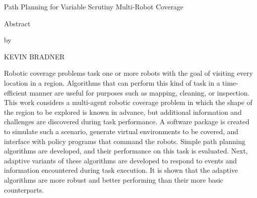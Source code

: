 \pagebreak

\begin{center}

Path Planning for Variable Scrutiny Multi-Robot Coverage

Abstract

by

KEVIN BRADNER

\end{center}

Robotic coverage problems task one or more robots with the goal of visiting every location in a region. Algorithms that can perform this kind of task in a time-efficient manner are useful for purposes such as mapping, cleaning, or inspection. This work considers a multi-agent robotic coverage problem in which the shape of the region to be explored is known in advance, but additional information and challenges are discovered during task performance. A software package is created to simulate such a scenario, generate virtual environments to be covered, and interface with policy programs that command the robots. Simple path planning algorithms are developed, and their performance on this task is evaluated. Next, adaptive variants of these algorithms are developed to respond to events and information encountered during task execution. It is shown that the adaptive algorithms are more robust and better performing than their more basic counterparts.